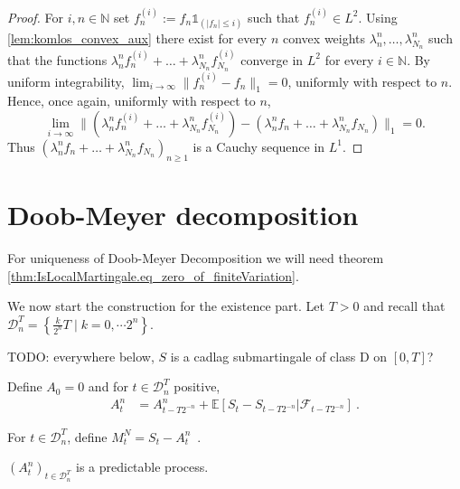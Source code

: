 \begin{proof}
  For $i,n\in\mathbb{N}$ set $f_{n}^{(i)}:=f_n \mathbb{1}_{(|f_n|\leq i)}$ such that $f_{n}^{(i)}\in L^2$.
  Using \ref{lem:komlos_convex_aux} there exist for every $n$ convex weights $\lambda_n^{n}, \ldots, \lambda_{N_n}^{n}$ such that the functions
  $ \lambda_n^{n} f_n^{(i)} + \ldots+\lambda_{N_n}^{n} f_{N_n}^{(i)}$ converge in $L^2$ for every $i\in\mathbb{N}$.
  By uniform integrability, $\lim_{i\to \infty}\| f^{(i)}_n- f_n\|_1=0$, uniformly with respect to $n$.
  Hence, once again, uniformly with respect to $n$,
  $$ \textstyle\lim_{i\to\infty}\|  (\lambda_n^{n} f_n^{(i)} + \ldots+\lambda_{N_n}^{n} f_{N_n}^{(i)})-(\lambda_n^{n} f_n + \ldots+\lambda_{N_n}^{n} f_{N_n})\|_1= 0.$$
  Thus $(\lambda_n^{n} f_n + \ldots+\lambda_{N_n}^{n} f_{N_n})_{n\geq 1}$  is a Cauchy sequence in $L^1$.
\end{proof}



\section{Doob-Meyer decomposition}



For uniqueness of Doob-Meyer Decomposition we will need theorem \ref{thm:IsLocalMartingale.eq_zero_of_finiteVariation}.

We now start the construction for the existence part.
Let $T>0$ and recall that $\mathcal{D}_n^T=\left\lbrace \frac{k}{2^n}T \mid k=0,\cdots 2^n\right\rbrace$.

TODO: everywhere below, $S$ is a cadlag submartingale of class D on $[0,T]$?

\begin{definition}[A]\label{def:A}
Define $A_0=0$ and for $t\in\mathcal{D}_n^T$ positive,
\begin{align*}
A^n_t
&=A^n_{t-T2^{-n}} + \mathbb{E}\left[ S_t-S_{t-T2^{-n}}|\mathcal{F}_{t-T2^{-n}}\right]
\: .
\end{align*}
\end{definition}


\begin{definition}[M]\label{def:M}
For $t\in\mathcal{D}_n^T$, define $M^N_t = S_t-A^n_t$~.
\end{definition}


\begin{lemma}\label{lem:Doob_Meyer_Finite_Predictable}
  $(A^n_t)_{t\in\mathcal{D}_n^T}$ is a predictable process.
\end{lemma}

